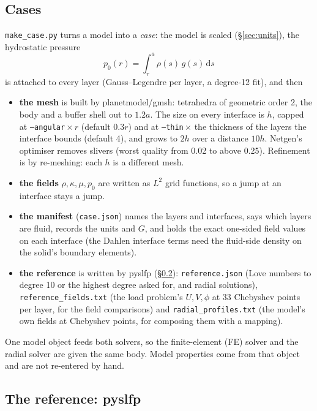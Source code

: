 \documentclass[11pt]{article}
\numberwithin{equation}{section}
\newcommand{\code}[1]{\texttt{#1}}
\begin{document}
\subsection{Cases}
\label{sec:cases}

\code{make\_case.py} turns a model into a \emph{case}: the model is
scaled (\S\ref{sec:units}), the hydrostatic pressure
\begin{equation}
  p_0(r) = \int_r^a \rho(s)\,g(s)\,\mathrm{d}s
  \label{eq:p0}
\end{equation}
is attached to every layer (Gauss--Legendre per layer, a degree-12 fit),
and then
\begin{itemize}[leftmargin=*]
\item \textbf{the mesh} is built by planetmodel/gmsh: tetrahedra of
  geometric order 2, the body and a buffer shell out to $1.2a$. The size
  on every interface is $h$, capped at \code{--angular}\,$\times\,r$
  (default $0.3r$) and at \code{--thin}\,$\times$ the thickness of the
  layers the interface bounds (default 4), and grows to $2h$ over a
  distance $10h$. Netgen's optimiser removes slivers (worst quality from
  0.02 to above 0.25). Refinement is by re-meshing: each $h$ is a different
  mesh.
\item \textbf{the fields} $\rho,\kappa,\mu,p_0$ are written as $L^2$
  grid functions, so a jump at an interface stays a jump.
\item \textbf{the manifest} (\code{case.json}) names the layers and
  interfaces, says which layers are fluid, records the units and $G$,
  and holds the exact one-sided field values on each interface (the
  Dahlen interface terms need the fluid-side density on the solid's
  boundary elements).
\item \textbf{the reference} is written by pyslfp (\S\ref{sec:reference}):
  \code{reference.json} (Love numbers to degree 10 or the highest degree
  asked for, and radial solutions), \code{reference\_fields.txt} (the load
  problem's $U,V,\phi$ at 33 Chebyshev points per layer, for the field
  comparisons) and \code{radial\_profiles.txt} (the model's own fields at
  Chebyshev points, for composing them with a mapping).
\end{itemize}
One model object feeds both solvers, so the finite-element (FE) solver
and the radial solver are given the same body. Model properties come
from that object and are not re-entered by hand.

\subsection{The reference: pyslfp}
\label{sec:reference}
\end{document}
